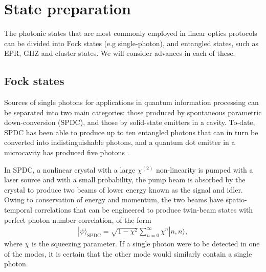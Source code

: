 \documentclass[times,final]{elsarticle}
\newcommand{\ket}[1]{|#1\rangle}
\newcommand{\sihui}[1]{{\color{red}{#1}}}
\begin{document}


\section{State preparation}\label{sec:state}

The photonic states that are most commonly employed in linear optics protocols can be divided into Fock states (e.g single-photon), and entangled states, such as EPR, GHZ and cluster states. We will consider advances in each of these. \sihui{Quantum state engineering using quantum interferometers has also attracted some interest, and is discussed at the end of this section.}

\subsection{Fock states}\label{sec:singlephotons}

Sources of single photons for applications in quantum information processing can be separated into two main categories: those produced by spontaneous parametric down-conversion (SPDC), and those by solid-state emitters in a cavity. To-date, SPDC has been able to produce up to ten entangled photons \cite{bib:WangChen16,bib:Chen17} that can in turn be converted into indistinguishable photons, and a quantum dot emitter in a microcavity has produced five photons \cite{bib:WangHe16}.

In SPDC, a nonlinear crystal with a large $\chi^{(2)}$ non-linearity is pumped with a laser source and with a small probability, the pump beam is absorbed by the crystal to produce two beams of lower energy known as the signal and idler. Owing to conservation of energy and momentum, the two beams have spatio-temporal correlations that can be engineered to produce twin-beam states with perfect  photon number correlation, of the form
\begin{align}
\ket\psi_\mathrm{SPDC} = \sqrt{1-\chi^2} \sum_{n=0}^\infty \chi^n \ket{n,n},	
\end{align}
where $\chi$ is the squeezing parameter. If a single photon were to be detected in one of the modes, it is certain that the other mode would similarly contain a single photon.
\end{document}

